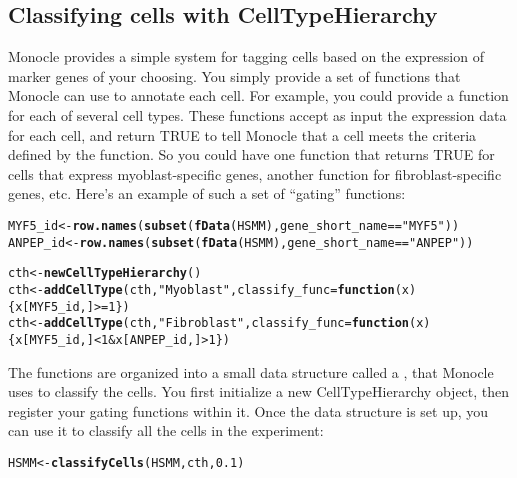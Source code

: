 \documentclass[10pt,oneside]{article}\usepackage[]{graphicx}\usepackage[]{color}
\makeatletter
\newcommand{\hlnum}[1]{\textcolor[rgb]{0.686,0.059,0.569}{#1}}%
\newcommand{\hlstr}[1]{\textcolor[rgb]{0.192,0.494,0.8}{#1}}%
\newcommand{\hlopt}[1]{\textcolor[rgb]{0,0,0}{#1}}%
\newcommand{\hlstd}[1]{\textcolor[rgb]{0.345,0.345,0.345}{#1}}%
\newcommand{\hlkwa}[1]{\textcolor[rgb]{0.161,0.373,0.58}{\textbf{#1}}}%
\newcommand{\hlkwb}[1]{\textcolor[rgb]{0.69,0.353,0.396}{#1}}%
\newcommand{\hlkwc}[1]{\textcolor[rgb]{0.333,0.667,0.333}{#1}}%
\newcommand{\hlkwd}[1]{\textcolor[rgb]{0.737,0.353,0.396}{\textbf{#1}}}%
\newenvironment{kframe}{%
 \def\at@end@of@kframe{}%
 \ifinner\ifhmode%
  \def\at@end@of@kframe{\end{minipage}}%
  \begin{minipage}{\columnwidth}%
 \fi\fi%
 \def\FrameCommand##1{\hskip\@totalleftmargin \hskip-\fboxsep
 \colorbox{shadecolor}{##1}\hskip-\fboxsep
     \hskip-\linewidth \hskip-\@totalleftmargin \hskip\columnwidth}%
 \MakeFramed {\advance\hsize-\width
   \@totalleftmargin\z@ \linewidth\hsize
   \@setminipage}}%
 {\par\unskip\endMakeFramed%
 \at@end@of@kframe}
\newenvironment{knitrout}{}{} %
\makeatother
\begin{document}
 \subsection{Classifying cells with CellTypeHierarchy}
 Monocle provides a simple system for tagging cells based on the expression of marker genes of your choosing. You simply provide a set of functions that Monocle can use to annotate each cell. For example, you could provide a function for each of several cell types. These functions accept as input the expression data for each cell, and return TRUE to tell Monocle that a cell meets the criteria defined by the function. So you could have one function that returns TRUE for cells that express myoblast-specific genes, another function for fibroblast-specific genes, etc. Here's an example of such a set of ``gating'' functions:
 
\begin{knitrout}
\color{fgcolor}\begin{kframe}
\begin{alltt}
\hlstd{MYF5_id} \hlkwb{<-} \hlkwd{row.names}\hlstd{(}\hlkwd{subset}\hlstd{(}\hlkwd{fData}\hlstd{(HSMM), gene_short_name} \hlopt{==} \hlstr{"MYF5"}\hlstd{))}
\hlstd{ANPEP_id} \hlkwb{<-} \hlkwd{row.names}\hlstd{(}\hlkwd{subset}\hlstd{(}\hlkwd{fData}\hlstd{(HSMM), gene_short_name} \hlopt{==} \hlstr{"ANPEP"}\hlstd{))}

\hlstd{cth} \hlkwb{<-} \hlkwd{newCellTypeHierarchy}\hlstd{()}
\hlstd{cth} \hlkwb{<-} \hlkwd{addCellType}\hlstd{(cth,} \hlstr{"Myoblast"}\hlstd{,} \hlkwc{classify_func}\hlstd{=}\hlkwa{function}\hlstd{(}\hlkwc{x}\hlstd{) \{x[MYF5_id,]} \hlopt{>=} \hlnum{1}\hlstd{\})}
\hlstd{cth} \hlkwb{<-} \hlkwd{addCellType}\hlstd{(cth,} \hlstr{"Fibroblast"}\hlstd{,} \hlkwc{classify_func}\hlstd{=}\hlkwa{function}\hlstd{(}\hlkwc{x}\hlstd{)}
       \hlstd{\{x[MYF5_id,]} \hlopt{<} \hlnum{1} \hlopt{&} \hlstd{x[ANPEP_id,]} \hlopt{>} \hlnum{1}\hlstd{\})}
\end{alltt}
\end{kframe}
\end{knitrout}
 
 The functions are organized into a small data structure called a , that Monocle uses to classify the cells. You first initialize a new CellTypeHierarchy object, then register your gating functions within it. Once the data structure is set up, you can use it to classify all the cells in the experiment:
 
\begin{knitrout}
\color{fgcolor}\begin{kframe}
\begin{alltt}
\hlstd{HSMM} \hlkwb{<-} \hlkwd{classifyCells}\hlstd{(HSMM, cth,} \hlnum{0.1}\hlstd{)}
\end{alltt}
\end{kframe}
\end{knitrout}
 
\end{document}
